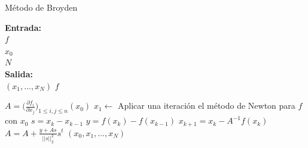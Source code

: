 
\begin{algorithm}[H]
	\caption{Método de Broyden}
	\hspace*{\algorithmicindent}\textbf{Entrada: } \\
	\hspace*{\algorithmicindent*2} $f$  \\
	\hspace*{\algorithmicindent*2} $x_0$  \\
	\hspace*{\algorithmicindent*2} $N$  \\
	\hspace*{\algorithmicindent}\textbf{Salida:} \\
	\hspace*{\algorithmicindent*2} $(x_1, \dots , x_N)$  $f$
	\begin{algorithmic}
		\Procedure {}{}
		\State $A = \Big(\frac{\partial f_i}{\partial x_j}\Big)_{1 \leq i , j \leq n}(x_0)$ 
		\State $x_1 \leftarrow$ Aplicar una iteración el método de Newton para $f$ con $x_0$
			\State $s = x_k - x_{k-1}$
			\State $y = f(x_k) - f(x_{k-1})$
			\State $x_{k+1} = x_k - A^{-1} f(x_k)$
			\State $A = A + \frac{y + A s}{||s||_2^2} s^t$ 
		\EndFor
		\State \Return $(x_0, x_1, \dots, x_N)$ 
		\EndProcedure
	\end{algorithmic}
\end{algorithm}

